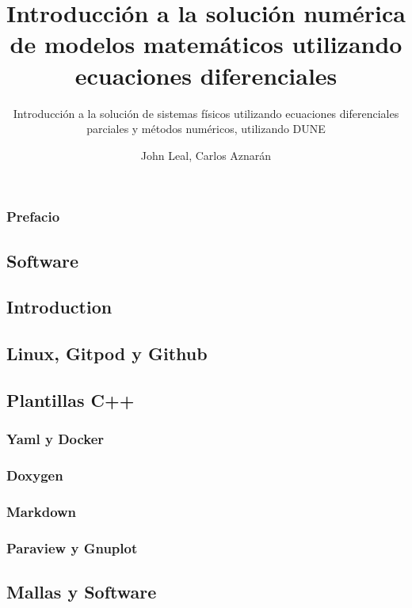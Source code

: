 \documentclass[10pt,
	a4paper,
	spanish,
	titlepage=firstiscover,
	titlepage=true,
	BCOR=2cm,
	DIV=12
]{scrbook}
\author{John Leal, Carlos Aznarán}
\title{Introducción a la solución numérica de modelos matemáticos utilizando ecuaciones 
	diferenciales}
\subtitle{Introducción a la solución de sistemas físicos utilizando ecuaciones diferenciales 
	parciales y métodos numéricos, utilizando DUNE}
\begin{document}
\extratitle{}

\maketitle

\section*{Prefacio}

\tableofcontents

\begin{refsection}
	\part{Software} %
	\chapter{Introduction}
	\chapter{Linux, Gitpod y Github}
	\chapter{Plantillas C++}
	\section{Yaml y Docker}
	\section{Doxygen}
	\section{Markdown}
	\section{Paraview y Gnuplot}
	\chapter{Mallas y Software}

\end{refsection}
\end{document}
